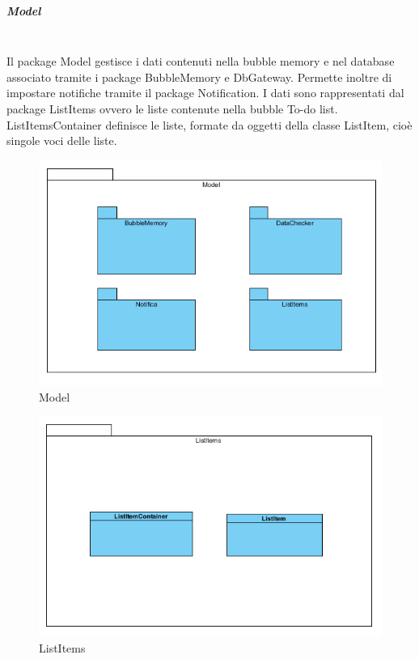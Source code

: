 \subparagraph{Model}\mbox{}\\
Il package Model gestisce i dati contenuti nella bubble memory e nel database associato tramite i package BubbleMemory e Db\-Gateway. Permette inoltre di impostare notifiche tramite il package Notification. I dati sono rappresentati dal package List\-Items ovvero le liste contenute nella bubble To-do list. List\-Items\-Container definisce le liste, formate da oggetti della classe List\-Item, cioè singole voci delle liste. 
\begin{figure}[H]
	\centering
	\includegraphics[width=14cm]{../../documenti/SpecificaTecnica/diagrammi_img/classi_e_package/todo_model.png}
	\caption{Model}
\end{figure}

\begin{figure}[H]
	\centering
	\includegraphics[width=14cm]{../../documenti/SpecificaTecnica/diagrammi_img/classi_e_package/todo_listitems.png}
	\caption{List\-Items}
\end{figure}

